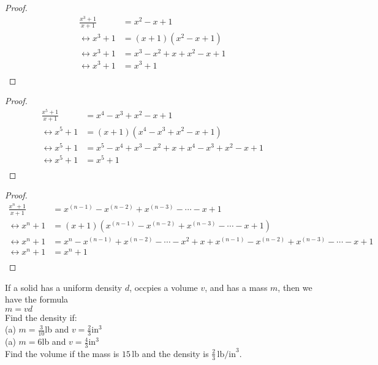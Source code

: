 \begin{proof}
\begin{align*}
\frac{x^3 + 1}{x + 1} &= x^2 - x + 1 && \\
\leftrightarrow x^3 + 1 &= (x + 1)(x^2 - x + 1) && \\
\leftrightarrow x^3 + 1 &= x^3 - x^2 + x + x^2 - x + 1 && \\
\leftrightarrow x^3 + 1 &= x^3 + 1 && \\
\end{align*}
\end{proof}
\begin{proof}
\begin{align*}
\frac{x^5 + 1}{x + 1} &= x^4 - x^3 + x^2 - x + 1 && \\
\leftrightarrow x^5 + 1 &= (x + 1)(x^4 - x^3 + x^2 - x + 1) && \\
\leftrightarrow x^5 + 1 &= x^5 - x^4 + x^3 - x^2 + x +x^4 - x^3 + x^2 - x + 1 && \\
\leftrightarrow x^5 + 1 &= x^5 + 1 && \\
\end{align*}
\end{proof}
\begin{proof}
\begin{align*}
\frac{x^n + 1}{x + 1} &= x^{(n - 1)} - x^{(n - 2)} + x^{(n - 3)} - \cdots -x + 1 && \\
\leftrightarrow x^n + 1 &= (x + 1)(x^{(n - 1)} - x^{(n - 2)} + x^{(n - 3)} - \cdots -x + 1) && \\
\leftrightarrow x^n + 1 &= x^n - x^{(n - 1)} + x^{(n - 2)} - \cdots - x^2  + x
    + x^{(n - 1)} - x^{(n - 2)} + x^{(n - 3)} - \cdots - x + 1 && \\
    \leftrightarrow x^n + 1 &= x^n + 1&& \\
\end{align*}
\end{proof}


\begin{tcolorbox}[title=Problem 7, breakable]
If a solid has a uniform density $d$, occpies a volume $v$, and has a mass $m$,
then we have the formula \\
$m = vd$ \\
Find the density if: \\
(a) $m = \frac{3}{10}$lb and $v = \frac{2}{3}$in$^3$ \\
(a) $m = 6$lb and $v = \frac{4}{3}$in$^3$ \\
Find the volume if the mass is $15\,\text{lb}$ and the density 
is $\frac{2}{3}\,\text{lb/in}^3$.
\end{tcolorbox}

